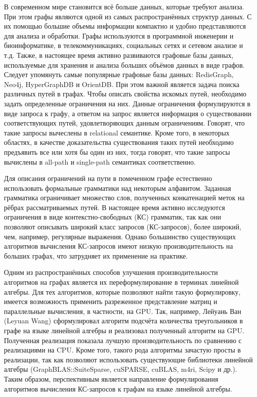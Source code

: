 
{\actuality} 
В современном мире становится всё больше данных, которые требуют анализа. При этом графы являются одной из самых распространённых структур данных. С их помощью большие объемы информации компактно и удобно представляются для анализа и обработки. Графы используются в программной инженерии и биоинформатике, в телекоммуникациях, социальных сетях и сетевом анализе и т.д. Также, в настоящее время активно развиваются графовые базы данных, используемые для хранения и анализа больших объёмов данных в виде графов. Следует упомянуть самые популярные графовые базы данных: RedisGraph, Neo4j, HyperGraphDB и OrientDB. При этом важной является задача поиска различных путей в графах. Чтобы описать свойства искомых путей, необходимо задать определенные ограничения на них. Данные ограничения формулируются в виде запроса к графу, а ответом на запрос является информация о существовании соответствующих путей, удовлетворяющих данным ограничениям. Говорят, что такие запросы вычеслены в relational семантике. Кроме того, в некоторых областях, в качестве доказательства существования таких путей необходимо предъявить все или хотя бы один из них, тогда говорят, что такие запросы вычислены в all-path и single-path семантиках соответственно.

Для описания ограничений на пути в помеченном графе естественно использовать формальные грамматики над некоторым алфавитом. Заданная грамматика ограничивает множество слов, полученных конкатенацией меток на рёбрах рассматриваемых путей. В настоящее время активно исследуются ограничения в виде контекстно-свободных (КС) грамматик, так как они позволяют описывать широкий класс запросов (КС-запросов), более широкий, чем, например, регулярные выражения. Однако большинство существующих алгоритмов вычисления КС-запросов имеют низкую производительность на больших графах, что затрудняет их применение на практике.

Одним из распространённых способов улучшения производительности алгоритмов на графах является их переформулирование в терминах линейной алгебры. Для тех алгоритмов, которые позволяют найти такую формулировку, имеется возможность применить разреженное представление матриц и параллельные вычисления, в частности, на GPU. Так, например, Лейуань Ван (Leyuan Wang) сформулировал алгоритм подсчёта количества треугольников в графе на языке линейной алгебры и реализовал полученный алгоритм на GPU. Полученная реализация показала лучшую производительность по сравнению с реализациями на CPU. Кроме того, такого рода алгоритмы зачастую просты в реализации, так как позволяют использовать существующие библиотеки линейной алгебры (GraphBLAS::SuiteSparse, cuSPARSE, cuBLAS, m4ri, Scipy и др.). Таким образом, перспективным является направление формулирования алгоритмов вычисления КС-запросов к графам на языке линейной алгебры.

